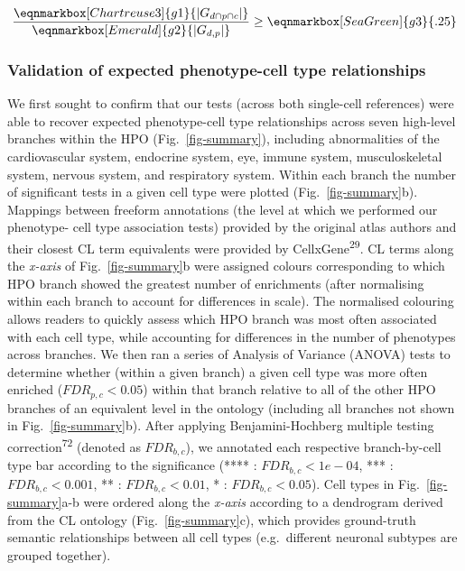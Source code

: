 \documentclass[
sn-nature
]{sn-jnl}
\begin{document}
\hfill\break

\begin{equation*}
  \frac{
     \eqnmarkbox[Chartreuse3]{g1}{|G_{d \cap p \cap c} |}
    }{
       \eqnmarkbox[Emerald]{g2}{|G_{d,p}|}} 
  \geq \eqnmarkbox[SeaGreen]{g3}{.25} 
\end{equation*}

\hfill\break

\subsubsection{Validation of expected phenotype-cell type
relationships}\label{validation-of-expected-phenotype-cell-type-relationships-1}

We first sought to confirm that our tests (across both single-cell
references) were able to recover expected phenotype-cell type
relationships across seven high-level branches within the HPO
(Fig.~\ref{fig-summary}), including abnormalities of the cardiovascular
system, endocrine system, eye, immune system, musculoskeletal system,
nervous system, and respiratory system. Within each branch the number of
significant tests in a given cell type were plotted
(Fig.~\ref{fig-summary}b). Mappings between freeform annotations (the
level at which we performed our phenotype- cell type association tests)
provided by the original atlas authors and their closest CL term
equivalents were provided by CellxGene\textsuperscript{29}. CL terms
along the \emph{x-axis} of Fig.~\ref{fig-summary}b were assigned colours
corresponding to which HPO branch showed the greatest number of
enrichments (after normalising within each branch to account for
differences in scale). The normalised colouring allows readers to
quickly assess which HPO branch was most often associated with each cell
type, while accounting for differences in the number of phenotypes
across branches. We then ran a series of Analysis of Variance (ANOVA)
tests to determine whether (within a given branch) a given cell type was
more often enriched (\(FDR_{p,c}<0.05\)) within that branch relative to
all of the other HPO branches of an equivalent level in the ontology
(including all branches not shown in Fig.~\ref{fig-summary}b). After
applying Benjamini-Hochberg multiple testing
correction\textsuperscript{72} (denoted as \(FDR _{b,c}\)), we annotated
each respective branch-by-cell type bar according to the significance
(**** : \(FDR _{b,c}<1e-04\), *** : \(FDR _{b,c}<0.001\), ** :
\(FDR _{b,c}<0.01\), * : \(FDR _{b,c}<0.05\)). Cell types in
Fig.~\ref{fig-summary}a-b were ordered along the \emph{x-axis} according
to a dendrogram derived from the CL ontology (Fig.~\ref{fig-summary}c),
which provides ground-truth semantic relationships between all cell
types (e.g.~different neuronal subtypes are grouped together).
\end{document}
